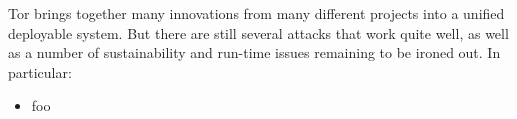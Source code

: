 \documentclass[times,10pt,twocolumn]{article}
\begin{document}
Tor brings together many innovations from many different projects into
a unified deployable system. But there are still several attacks that
work quite well, as well as a number of sustainability and run-time
issues remaining to be ironed out. In particular:

\begin{itemize}
\item foo
\end{itemize}






\end{document}
